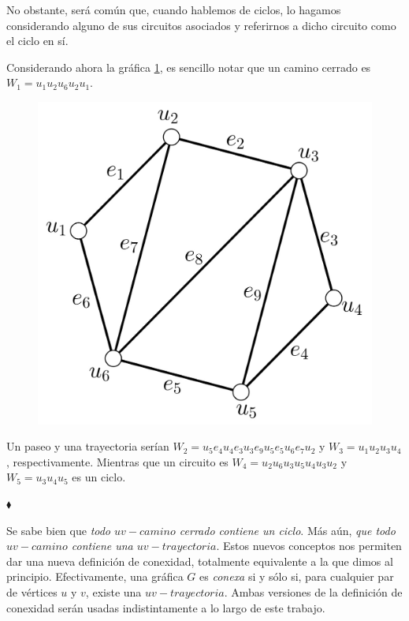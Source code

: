 No obstante, será común que, cuando hablemos de ciclos, lo hagamos considerando alguno de sus circuitos asociados y referirnos a dicho circuito como el ciclo en sí. 

\begin{ejem}
Considerando ahora la gráfica \ref{fig:GrafoCaminos2}, es sencillo notar que un camino cerrado es $W_{1}=u_{1}u_{2}u_{6}u_{2}u_{1}$. 
 \begin{figure}[H]
    \centering
    \includegraphics[scale=0.22]{img/imgchapter1/GrafoCaminos2.jpg}
    \caption{}
    \label{fig:GrafoCaminos2}
\end{figure}
Un paseo y una trayectoria serían $W_{2}=u_{5}e_{4}u_{4}e_{3}u_{3}e_{9}u_{5}e_{5}u_{6}e_{7}u_{2}$ y $W_{3} = u_{1}u_{2}u_{3}u_{4}$, respectivamente. Mientras que un circuito es $W_{4}=u_{2}u_{6}u_{3}u_{5}u_{4}u_{3}u_{2}$ y $W_{5}=u_{3}u_{4}u_{5}$ es un ciclo.

\hfill $\blacklozenge$
\end{ejem}

Se sabe bien que \textit{todo $uv-camino$ cerrado contiene un ciclo}. Más aún, \textit{que todo $uv-camino$ contiene una $uv-trayectoria$}. Estos nuevos conceptos nos permiten dar una nueva definición de conexidad, totalmente equivalente a la que dimos al principio. Efectivamente, una gráfica $G$ es \textit{conexa} si y sólo si, para cualquier par de vértices $u$ y $v$, existe una $uv-trayectoria$. Ambas versiones de la definición de conexidad serán usadas indistintamente a lo largo de este trabajo.

